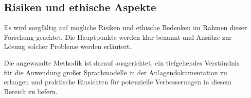 \subsection{Risiken und ethische Aspekte}
Es wird sorgfältig auf mögliche Risiken und ethische Bedenken im Rahmen dieser Forschung geachtet. Die Hauptpunkte werden klar benannt und Ansätze zur Lösung solcher Probleme werden erläutert.

Die angewandte Methodik ist darauf ausgerichtet, ein tiefgehendes Verständnis für die Anwendung großer Sprachmodelle in der Anlagendokumentation zu erlangen und praktische Einsichten für potenzielle Verbesserungen in diesem Bereich zu liefern.
